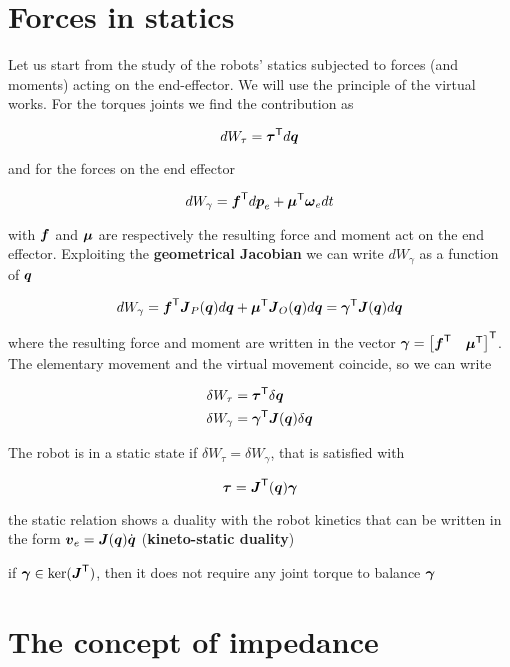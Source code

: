 \section{Forces in statics}

Let us start from the study of the robots' statics subjected to forces (and moments) acting on the end-effector.
We will use the principle of the virtual works.
For the torques joints we find the contribution as

\[
	dW_\tau = \boldsymbol{\tau}^{\mathsf{T}} d\boldsymbol{q}
\]

and for the forces on the end effector

\[
	dW_\gamma = \boldsymbol{f}^{\mathsf{T}} d\boldsymbol{p}_e + \boldsymbol{\mu}^{\mathsf{T}} \boldsymbol{\omega}_e dt
\]

with $\boldsymbol{f}$ and $\boldsymbol{\mu}$ are respectively the resulting force and moment act on the end effector.
Exploiting the \textbf{geometrical Jacobian} we can write $dW_\gamma$ as a function of $\boldsymbol{q}$

\[
	dW_\gamma = \boldsymbol{f}^{\mathsf{T}} \boldsymbol{J}_P(\boldsymbol{q}) d\boldsymbol{q} + \boldsymbol{\mu}^{\mathsf{T}} \boldsymbol{J}_O(\boldsymbol{q}) d\boldsymbol{q} = \boldsymbol{\gamma}^{\mathsf{T}} \boldsymbol{J}(\boldsymbol{q}) d\boldsymbol{q}
\]

where the resulting force and moment are written in the vector $\boldsymbol{\gamma} = \begin{bmatrix} \boldsymbol{f}^{\mathsf{T}} & \boldsymbol{\mu}^{\mathsf{T}} \end{bmatrix}^{\mathsf{T}}$.
The elementary movement and the virtual movement coincide, so we can write

\begin{align*}
	\delta W_\tau &= \boldsymbol{\tau}^{\mathsf{T}} \delta\boldsymbol{q} \\
	\delta W_\gamma &= \boldsymbol{\gamma}^{\mathsf{T}} \boldsymbol{J}(\boldsymbol{q}) \delta\boldsymbol{q}
\end{align*}

The robot is in a static state if $\delta W_\tau = \delta W_\gamma$, that is satisfied with

\[
	\boldsymbol{\tau} = \boldsymbol{J}^{\mathsf{T}}(\boldsymbol{q}) \boldsymbol{\gamma}
\]

\begin{nb}the static relation shows a duality with the robot kinetics that can be written in the form $\boldsymbol{v}_e = \boldsymbol{J}(\boldsymbol{q}) \dot{\boldsymbol{q}}$ (\textbf{kineto-static duality})\end{nb}

\begin{nb}if $\boldsymbol{\gamma} \in \ker(\boldsymbol{J}^{\mathsf{T}})$, then it does not require any joint torque to balance $\boldsymbol{\gamma}$\end{nb}


\section{The concept of impedance}

